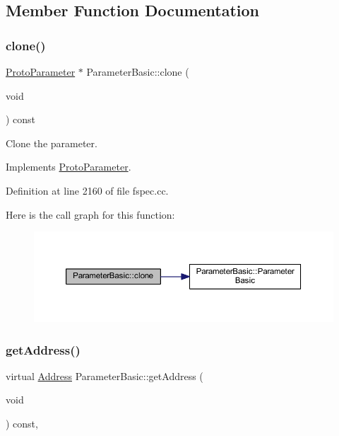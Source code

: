 \subsection{Member Function Documentation}
\mbox{\label{class_parameter_basic_af5f84234790a83cb3ca98c7155730355}} 
\subsubsection{\texorpdfstring{clone()}{clone()}}
{\footnotesize\ttfamily \mbox{\hyperlink{class_proto_parameter}{Proto\+Parameter}} $\ast$ Parameter\+Basic\+::clone (\begin{DoxyParamCaption}\item[{void}]{ }\end{DoxyParamCaption}) const\hspace{0.3cm}{\ttfamily [virtual]}}



Clone the parameter. 



Implements \mbox{\hyperlink{class_proto_parameter_a3f09d39a3c5f10b368753eaa0391bea8}{Proto\+Parameter}}.



Definition at line 2160 of file fspec.\+cc.

Here is the call graph for this function\+:
\nopagebreak
\begin{figure}[H]
\begin{center}
\leavevmode
\includegraphics[width=350pt]{class_parameter_basic_af5f84234790a83cb3ca98c7155730355_cgraph}
\end{center}
\end{figure}
\mbox{\label{class_parameter_basic_a0d007e8a1720e88d34aa139d62000c1a}} 
\subsubsection{\texorpdfstring{getAddress()}{getAddress()}}
{\footnotesize\ttfamily virtual \mbox{\hyperlink{class_address}{Address}} Parameter\+Basic\+::get\+Address (\begin{DoxyParamCaption}\item[{void}]{ }\end{DoxyParamCaption}) const\hspace{0.3cm}{\ttfamily [inline]}, {\ttfamily [virtual]}}



